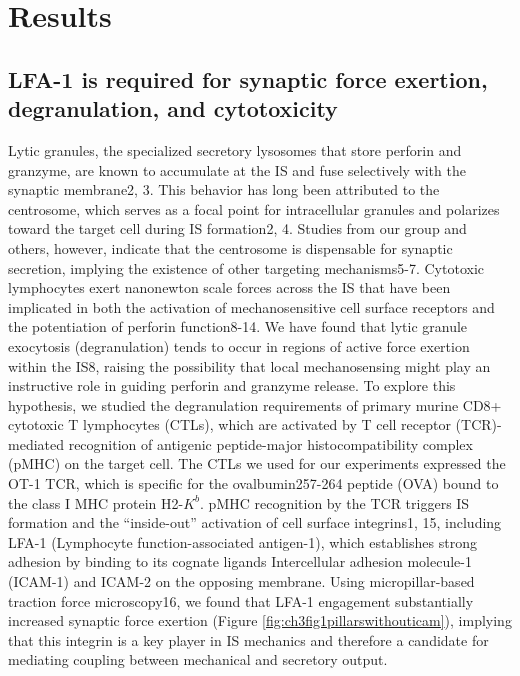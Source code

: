 \section{Results}

\subsection{LFA-1 is required for synaptic force exertion, degranulation, and cytotoxicity}
Lytic granules, the specialized secretory lysosomes that store perforin and granzyme, are known to accumulate at the IS and fuse selectively with the synaptic membrane2, 3. This behavior has long been attributed to the centrosome, which serves as a focal point for intracellular granules and polarizes toward the target cell during IS formation2, 4. Studies from our group and others, however, indicate that the centrosome is dispensable for synaptic secretion, implying the existence of other targeting mechanisms5-7. Cytotoxic lymphocytes exert nanonewton scale forces across the IS that have been implicated in both the activation of mechanosensitive cell surface receptors and the potentiation of perforin function8-14. We have found that lytic granule exocytosis (degranulation) tends to occur in regions of active force exertion within the IS8, raising the possibility that local mechanosensing might play an instructive role in guiding perforin and granzyme release. To explore this hypothesis, we studied the degranulation requirements of primary murine CD8+ cytotoxic T lymphocytes (CTLs), which are activated by T cell receptor (TCR)-mediated recognition of antigenic peptide-major histocompatibility complex (pMHC) on the target cell. The CTLs we used for our experiments expressed the OT-1 TCR, which is specific for the ovalbumin257-264 peptide (OVA) bound to the class I MHC protein H2-$K^{b}$. pMHC recognition by the TCR triggers IS formation and the “inside-out” activation of cell surface integrins1, 15, including LFA-1 (Lymphocyte function-associated antigen-1), which establishes strong adhesion by binding to its cognate ligands Intercellular adhesion molecule-1 (ICAM-1) and ICAM-2 on the opposing membrane. Using micropillar-based traction force microscopy16, we found that LFA-1 engagement substantially increased synaptic force exertion (Figure \ref{fig:ch3fig1pillarswithouticam}), implying that this integrin is a key player in IS mechanics and therefore a candidate for mediating coupling between mechanical and secretory output. 

